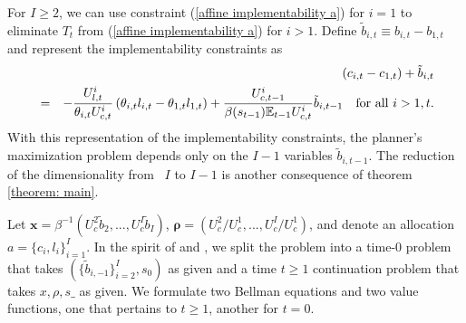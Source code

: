 \documentclass[thmsb,11pt]{article}
\begin{document}
\noindent For $I\geq 2$, we can use constraint (\ref{affine implementability
a}) for  $i=1$ to eliminate $T_{t}$ from (\ref{affine implementability a}) for $i > 1$. Define $\tilde{b}%
_{i,t}\equiv b_{i,t}-b_{1,t}$ and represent the implementability constraints
as
\begin{eqnarray}
&&\left( c_{i,t}-c_{1,t}\right) +\tilde{b}_{i,t}
\label{affine implementability b} \\
&=&-\frac{U_{l,t}^{i}}{\theta _{i,t}U_{c,t}^{i}}\left( \theta
_{i,t}l_{i,t}-\theta _{1,t}l_{1,t}\right) +\frac{U_{c,t-1}^{i}}{\beta(s_{t-1}) \mathbb{E}%
_{t-1}U_{c,t}^{i}}\tilde{b}_{i,t-1}\ \text{for\ all\ }i>1,t.  \notag
\end{eqnarray}%
\smallskip With this representation of the implementability constraints, the planner's
maximization problem depends only on the $I-1$ variables $\tilde{b}_{i,t-1}.$
The reduction of  the dimensionality from \ $I$ to $I-1$ is
 another consequence of theorem \ref{theorem: main}.

Let $\mathbf{x}= \beta^{-1}\left( U_{c}^{2}\tilde{b}_{2},...,U_{c}^{I}\tilde{b}_{I}\right)$, $\mathbf{\rho }=\left( U_{c}^{2}/U_{c}^{1},...,U_{c}^{I}/U_{c}^{1}\right) $, and denote an allocation $a=\{c_i,l_i\}^{I}_{i=1}.$ 
In the spirit of \cite{Kydland1980} and \cite{Farhi2010}, we split the problem into a time-0 problem that takes $(\{\tilde{b}_{i,-1}\}^{I}_{i=2}, s_0)$ as given and   a time $t \geq 1$ continuation problem  that takes $x,\rho,s\_$ as given. We formulate
two Bellman equations and two value functions, one that pertains to $t\geq 1$, another for $t=0$.
\end{document}
